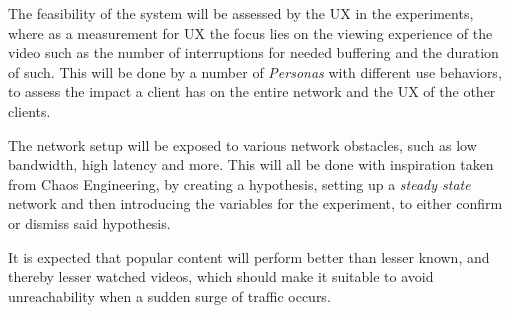The feasibility of the system will be assessed by the \ac{UX} in the experiments, where as a measurement for \ac{UX} the focus lies on the viewing experience of the video such as the number of interruptions for needed buffering and the duration of such. This will be done by a number of \emph{Personas} with different use behaviors, to assess the impact a client has on the entire network and the \ac{UX} of the other clients.


The network setup will be exposed to various network obstacles, such as low bandwidth, high latency and more. This will all be done with inspiration taken from Chaos Engineering, by creating a hypothesis, setting up a \emph{steady state} network and then introducing the variables for the experiment, to either confirm or dismiss said hypothesis.


It is expected that popular content will perform better than lesser known, and thereby lesser watched videos, which should make it suitable to avoid unreachability when a sudden surge of traffic occurs.


